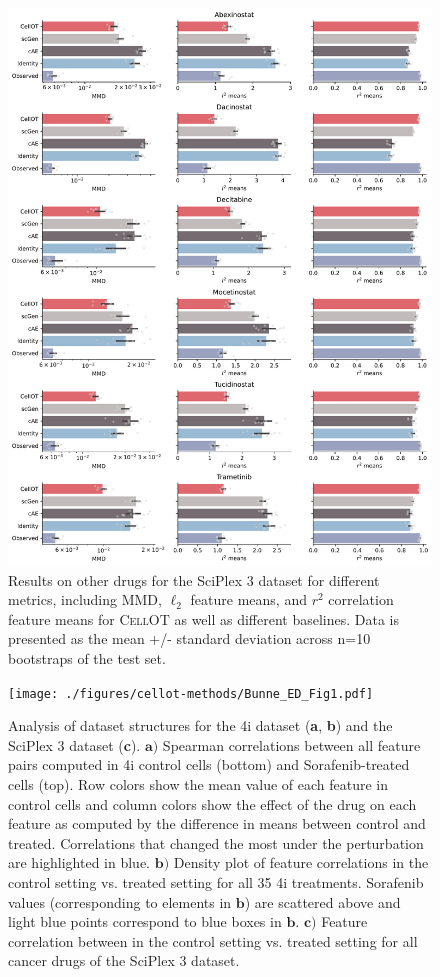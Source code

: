 \begin{figure}[H]
    \centering
    \includegraphics[width=.8\textwidth]{figures/cellot-methods/Bunne_Supp_Fig6.pdf}
    \caption{Results on other drugs for the SciPlex 3 dataset for different metrics, including MMD, $\ell_2$ feature means, and $r^2$ correlation feature means for \textsc{CellOT} as well as different baselines. Data is presented as the mean  +/- standard deviation across n=10 bootstraps of the test set.}
    \label{supp_fig:sciplex_all_results}
\end{figure}

\begin{figure}[H]
    \centering
    \texttt{[image: ./figures/cellot-methods/Bunne\_ED\_Fig1.pdf]}
    \caption{Analysis of dataset structures for the 4i dataset (\textbf{a}, \textbf{b}) and the SciPlex 3 dataset (\textbf{c}). $\textbf{a)}$ Spearman correlations between all feature pairs computed in 4i control cells (bottom) and Sorafenib-treated cells (top). Row colors show the mean value of each feature in control cells and column colors show the effect of the drug on each feature as computed by the difference in means between control and treated. Correlations that changed the most under the perturbation are highlighted in blue. $\textbf{b)}$ Density plot of feature correlations in the control setting vs. treated setting for all 35 4i treatments. Sorafenib values (corresponding to elements in $\textbf{b}$) are scattered above and light blue points correspond to blue boxes in $\textbf{b}$. $\textbf{c)}$ Feature correlation between in the control setting vs. treated setting for all cancer drugs of the SciPlex 3 dataset.}
    \label{supp_fig:data_correlation}
\end{figure}

